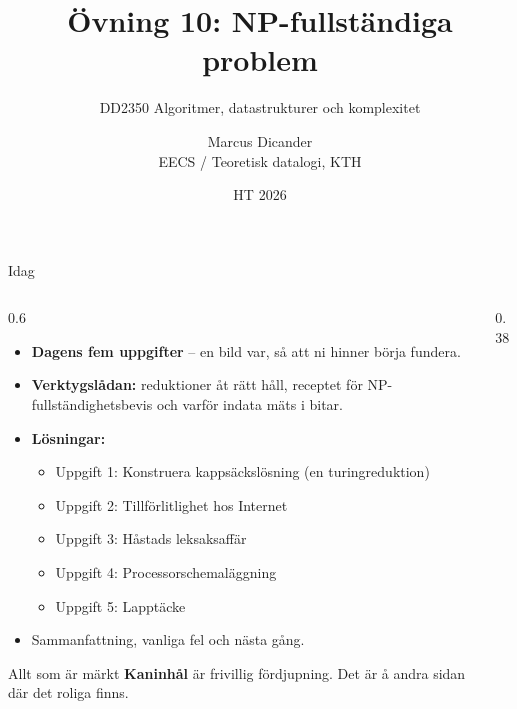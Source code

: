 \documentclass[aspectratio=169,10pt]{beamer}
\title{Övning 10: NP-fullständiga problem}
\subtitle{DD2350 Algoritmer, datastrukturer och komplexitet}
\author{Marcus Dicander\\EECS / Teoretisk datalogi, KTH}
\date{HT 2026}
\newcommand{\kaninhal}{\textcolor{warnorange}{\textbf{Kaninhål}}}
\newcommand{\lep}{\le_{\mathrm{p}}}
\begin{document}
\begin{frame}[plain]
  \titlepage
\end{frame}

\begin{frame}{Idag}
  \begin{columns}[T]
    \begin{column}{0.6\textwidth}
      \begin{itemize}
        \item \textbf{Dagens fem uppgifter} -- en bild var, så att ni hinner börja fundera.
        \item \textbf{Verktygslådan:} reduktioner åt rätt håll, receptet för NP-fullständighetsbevis och varför indata mäts i bitar.
        \item \textbf{Lösningar:}
          \begin{itemize}
            \item Uppgift 1: Konstruera kappsäckslösning (en turingreduktion)
            \item Uppgift 2: Tillförlitlighet hos Internet
            \item Uppgift 3: Håstads leksaksaffär
            \item Uppgift 4: Processorschemaläggning
            \item Uppgift 5: Lapptäcke
          \end{itemize}
        \item Sammanfattning, vanliga fel och nästa gång.
      \end{itemize}
      \vspace{2mm}
      {\small Allt som är märkt \kaninhal{} är frivillig fördjupning. Det är å andra sidan där det roliga finns.}
    \end{column}
    \begin{column}{0.38\textwidth}
      \centering
    \end{column}
  \end{columns}
\end{frame}
\end{document}
